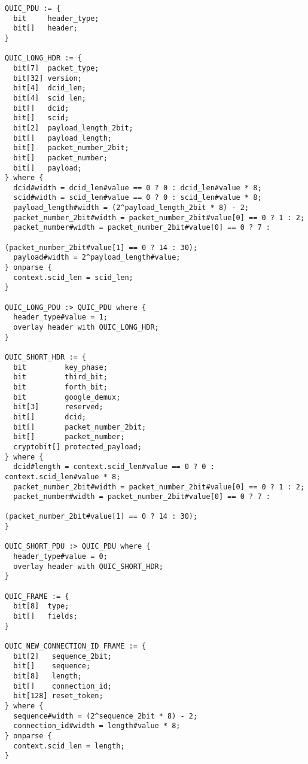 \documentclass[10pt]{article}
\begin{document}
\begin{verbatim}
QUIC_PDU := {
  bit     header_type;
  bit[]   header;
}

QUIC_LONG_HDR := {
  bit[7]  packet_type;
  bit[32] version;
  bit[4]  dcid_len;
  bit[4]  scid_len;
  bit[]   dcid;
  bit[]   scid;
  bit[2]  payload_length_2bit;
  bit[]   payload_length;
  bit[]   packet_number_2bit;
  bit[]   packet_number;
  bit[]   payload;
} where {
  dcid#width = dcid_len#value == 0 ? 0 : dcid_len#value * 8;
  scid#width = scid_len#value == 0 ? 0 : scid_len#value * 8;
  payload_length#width = (2^payload_length_2bit * 8) - 2;
  packet_number_2bit#width = packet_number_2bit#value[0] == 0 ? 1 : 2;
  packet_number#width = packet_number_2bit#value[0] == 0 ? 7 : 
  											  (packet_number_2bit#value[1] == 0 ? 14 : 30);
  payload#width = 2^payload_length#value;
} onparse {
  context.scid_len = scid_len;
}

QUIC_LONG_PDU :> QUIC_PDU where {
  header_type#value = 1;
  overlay header with QUIC_LONG_HDR;
}

QUIC_SHORT_HDR := {
  bit         key_phase;
  bit         third_bit;
  bit         forth_bit;
  bit         google_demux;
  bit[3]      reserved;
  bit[]       dcid;
  bit[]       packet_number_2bit;
  bit[]       packet_number;
  cryptobit[] protected_payload;
} where {
  dcid#length = context.scid_len#value == 0 ? 0 : context.scid_len#value * 8;
  packet_number_2bit#width = packet_number_2bit#value[0] == 0 ? 1 : 2;
  packet_number#width = packet_number_2bit#value[0] == 0 ? 7 : 
  											  (packet_number_2bit#value[1] == 0 ? 14 : 30);
}

QUIC_SHORT_PDU :> QUIC_PDU where {
  header_type#value = 0;
  overlay header with QUIC_SHORT_HDR;
}

QUIC_FRAME := {
  bit[8]  type;
  bit[]   fields;
}

QUIC_NEW_CONNECTION_ID_FRAME := {
  bit[2]   sequence_2bit;
  bit[]    sequence;
  bit[8]   length;
  bit[]    connection_id;
  bit[128] reset_token;
} where {
  sequence#width = (2^sequence_2bit * 8) - 2;
  connection_id#width = length#value * 8;
} onparse {
  context.scid_len = length;
}

\end{verbatim}



\end{document}
